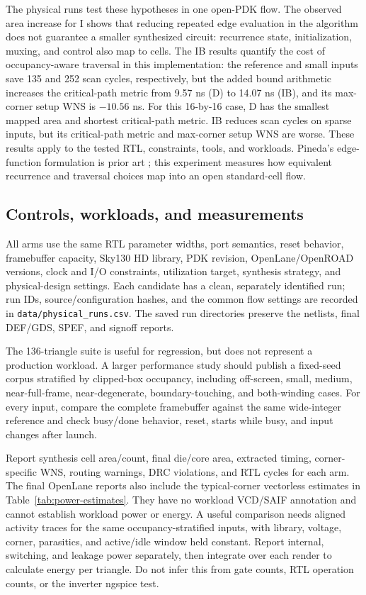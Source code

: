 \documentclass[10pt,a4paper]{article}
\begin{document}
The physical runs test these hypotheses in one open-PDK flow. The observed
area increase for I shows that reducing repeated edge evaluation in the
algorithm does not guarantee a smaller synthesized circuit: recurrence
state, initialization, muxing, and control also map to cells. The IB
results quantify the cost of occupancy-aware traversal in this implementation:
the reference and small inputs save 135 and 252 scan cycles, respectively,
but the added bound arithmetic increases the critical-path metric from
9.57 ns (D) to 14.07 ns (IB), and its max-corner setup WNS is \(-10.56\) ns.
For this 16-by-16 case, D has the smallest mapped area and shortest
critical-path metric. IB reduces scan cycles on sparse inputs, but its
critical-path metric and max-corner setup WNS are worse. These results apply
to the tested RTL, constraints, tools, and workloads. Pineda's edge-function
formulation is prior art \cite{Pineda1988}; this experiment measures how
equivalent recurrence and traversal choices map into an open standard-cell
flow.

\subsection{Controls, workloads, and measurements}

All arms use the same RTL parameter widths, port semantics, reset behavior,
framebuffer capacity, Sky130 HD library, PDK revision, OpenLane/OpenROAD
versions, clock and I/O constraints, utilization target, synthesis strategy,
and physical-design settings. Each candidate has a clean, separately
identified run; run IDs, source/configuration hashes, and the common flow
settings are recorded in \texttt{data/physical\_runs.csv}. The saved run
directories preserve the netlists, final DEF/GDS, SPEF, and signoff reports.

The 136-triangle suite is useful for regression, but does not represent a
production workload. A larger performance study should publish a
fixed-seed corpus stratified by clipped-box occupancy, including
off-screen, small, medium, near-full-frame, near-degenerate,
boundary-touching, and both-winding cases. For every input, compare the
complete framebuffer against the same wide-integer reference and check
busy/done behavior, reset, starts while busy, and input changes after
launch.

Report synthesis cell area/count, final die/core area, extracted timing,
corner-specific WNS, routing warnings, DRC violations, and RTL cycles for
each arm. The final OpenLane reports also include the typical-corner
vectorless estimates in Table~\ref{tab:power-estimates}. They have no
workload VCD/SAIF annotation and cannot establish workload power or energy.
A useful comparison needs aligned activity traces for the same
occupancy-stratified inputs, with library, voltage, corner, parasitics, and
active/idle window held constant. Report internal, switching, and leakage
power separately, then integrate over each render to calculate energy per
triangle. Do not infer this from gate counts, RTL operation counts, or the
inverter ngspice test.
\end{document}
